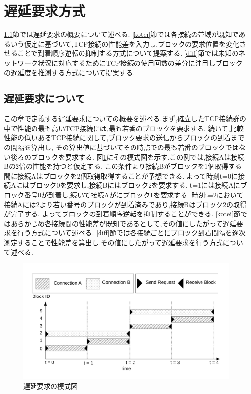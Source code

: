 \documentclass[a4j,12pt]{gradthesis_utf8}
\begin{document}
\section{遅延要求方式}
\label{chienyokyuhoshiki}
\ref{chienyokyu}節では遅延要求の概要について述べる.
\ref{kotei}節では各接続の帯域が既知であるいう仮定に基づいて,TCP接続の性能差を入力し,ブロックの要求位置を変化させることで到着順序逆転の抑制する方式について提案する.
\ref{diff}節では未知のネットワーク状況に対応するためにTCP接続の使用回数の差分に注目しブロックの遅延度を推測する方式について提案する.

\subsection{遅延要求について}
\label{chienyokyu}
この章で定義する遅延要求についての概要を述べる.まず,確立したTCP接続群の中で性能の最も高いTCP接続には,最も若番のブロックを要求する.
続いて,比較性能の低いあるTCP接続に関して,ブロック要求の送信からブロックの到着までの間隔を算出し,
その算出値に基づいてその時点での最も若番のブロックではない後ろのブロックを要求する.
図\ref{delay}にその模式図を示す.この例では,接続Aは接続Bの2倍の性能を持つと仮定する.
この条件より接続Bがブロックを1個取得する間に接続Aはブロックを2個取得取得することが予想できる.
よって時刻t=0に接続Aにはブロック0を要求し,接続Bにはブロック2を要求する.
t=1には接続Aにブロック番号0が到着し,続いて接続Aがにブロック1を要求する.
時刻t=2において接続Aには2より若い番号のブロックが到着済みであり,接続Bはブロック2の取得が完了する.
よってブロックの到着順序逆転を抑制することができる.
\ref{kotei}節ではあらかじめ各接続間の性能差が既知であるとして,その値にしたがって遅延要求を行う方式について述べる.
\ref{diff}節では各接続ごとにブロック到着間隔を逐次測定することで性能差を算出し,その値にしたがって遅延要求を行う方式について述べる.

 \begin{figure}[h]
    \centering
    \includegraphics[width=16.25cm]{figure/delay.pdf}
    \caption{遅延要求の模式図}
    \label{delay}
\end{figure}
\end{document}

